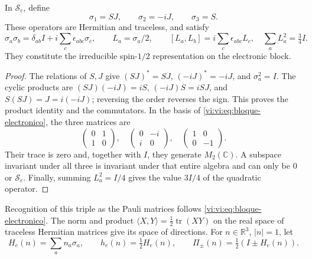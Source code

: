 \begin{proposition}
\label{vi:vi:prop:spin}
In $\mathscr S_e$, define
\begin{equation}
 \sigma_1=SJ,\qquad \sigma_2=-iJ,\qquad \sigma_3=S.
 \label{vi:vi:eq:terna}
\end{equation}
These operators are Hermitian and traceless, and satisfy
\begin{equation}
 \sigma_a\sigma_b=\delta_{ab}I+
 i\sum_c\epsilon_{abc}\sigma_c,
 \qquad L_a=\sigma_a/2,\qquad
 [L_a,L_b]=i\sum_c\epsilon_{abc}L_c,
 \quad\sum_aL_a^2=\tfrac34I.
 \label{vi:vi:eq:spin-algebra}
\end{equation}
They constitute the irreducible spin-$1/2$ representation on
the electronic block.
\end{proposition}
\begin{proof}
The relations of $S,J$ give $(SJ)^*=SJ$, $(-iJ)^*=-iJ$, and
$\sigma_a^2=I$. The cyclic products are
$(SJ)(-iJ)=iS$, $(-iJ)S=iSJ$, and $S(SJ)=J=i(-iJ)$;
reversing the order reverses the sign. This proves the product
identity and the commutators. In the basis of
\eqref{vi:vi:eq:bloque-electronico}, the three matrices are
\[
 \begin{pmatrix}0&1\\1&0\end{pmatrix},\quad
 \begin{pmatrix}0&-i\\i&0\end{pmatrix},\quad
 \begin{pmatrix}1&0\\0&-1\end{pmatrix}.
\]
Their trace is zero and, together with $I$, they generate $M_2(\mathbb C)$.
A subspace invariant under all three is invariant under that entire
algebra and can only be $0$ or $\mathscr S_e$. Finally,
summing $L_a^2=I/4$ gives the value $3I/4$ of the quadratic operator.
\end{proof}

Recognition of this triple as the Pauli matrices follows
\eqref{vi:vi:eq:bloque-electronico}. The norm and product
$\langle X,Y\rangle=\tfrac12\operatorname{tr}(XY)$ on the
real space of traceless Hermitian matrices give its space
of directions. For $n\in\mathbb R^3$, $|n|=1$, let
\begin{equation}
 H_e(n)=\sum_an_a\sigma_a,\qquad
 h_e(n)=\tfrac12H_e(n),\qquad
 \Pi_\pm(n)=\tfrac12(I\pm H_e(n)).
 \label{vi:vi:eq:helicidad}
\end{equation}

